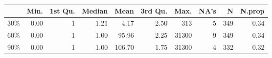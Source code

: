 \begin{table}[ht]
\centering
\begin{tabular}{lrrrrrrrrr}
  \hline
 & Min. & 1st Qu. & Median & Mean & 3rd Qu. & Max. & NA's & N & N.prop \\ 
  \hline
30\% & 0.00 &   1 & 1.21 & 4.17 & 2.50 & 313 &   5 & 349 & 0.34 \\ 
  60\% & 0.00 &   1 & 1.00 & 95.96 & 2.25 & 31300 &   9 & 349 & 0.34 \\ 
  90\% & 0.00 &   1 & 1.00 & 106.70 & 1.75 & 31300 &   4 & 332 & 0.32 \\ 
   \hline
\end{tabular}
\end{table}
